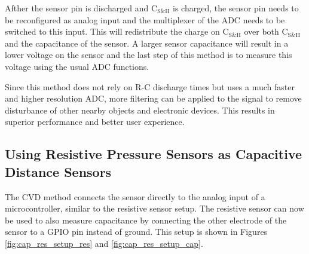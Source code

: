 \documentclass{sigchi-ext}
\begin{document}
Afther the sensor pin is discharged and $\textrm{C}_{\textrm{S\&H}}$ is
charged, the sensor pin needs to be reconfigured as analog input and the
multiplexer of the ADC needs to be switched to this input. This will
redistribute the charge on $\textrm{C}_{\textrm{S\&H}}$ over both
$\textrm{C}_{\textrm{S\&H}}$ and the capacitance of the sensor. A larger sensor
capacitance will result in a lower voltage on the sensor and the last step of
this method is to measure this voltage using the usual ADC functions.

Since this method does not rely on R-C discharge times but uses 
a much faster and higher resolution ADC, more filtering can be applied to the signal to remove
disturbance of other nearby objects and electronic devices. This results in
superior performance and better user experience.

\subsection{Using Resistive Pressure Sensors as Capacitive Distance Sensors}
The CVD method connects the sensor directly to the analog input of a
microcontroller, similar to the resistive sensor setup. The resistive sensor can
now be used to also measure capacitance by connecting the other electrode of the
sensor to a GPIO pin instead of ground. This setup is shown in Figures
\ref{fig:cap_res_setup_res} and \ref{fig:cap_res_setup_cap}.
\end{document}
